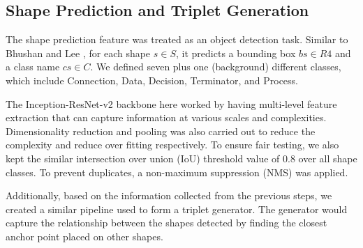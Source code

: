 \subsection{Shape Prediction and Triplet Generation}
The shape prediction feature was treated as an object detection task. Similar to Bhushan and Lee \cite{bhushan-lee-2022-block}, for each shape $s \in S$, it predicts a bounding box $bs \in R4$ and a class name $cs \in C$. We defined seven plus one (background) different classes, which include Connection, Data, Decision, Terminator, and Process. 

The Inception-ResNet-v2 backbone here worked by having multi-level feature extraction that can capture information at various scales and complexities. Dimensionality reduction and pooling was also carried out to reduce the complexity and reduce over fitting respectively. To ensure fair testing, we also kept the similar intersection over union (IoU) threshold value of 0.8 over all shape classes. To prevent duplicates, a non-maximum suppression (NMS) was applied. 


Additionally, based on the information collected from the previous steps, we created a similar pipeline used to form a triplet generator. The generator would capture the relationship between the shapes detected by finding the closest anchor point placed on other shapes.

